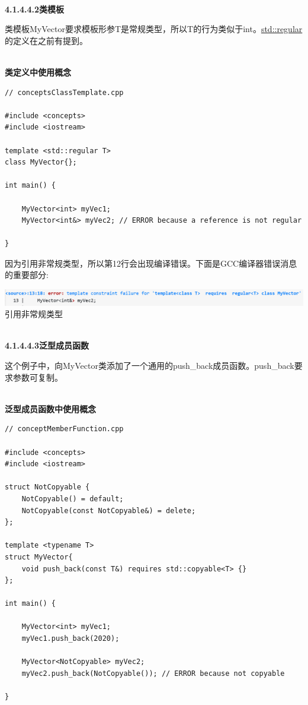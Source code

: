 \hspace*{\fill} \\ %
\noindent
\textbf{4.1.4.4.2\hspace{0.2cm}类模板}

类模板MyVector要求模板形参T是常规类型，所以T的行为类似于int。\href{https://en.cppreference.com/w/cpp/concepts/regular}{std::regular}的定义在之前有提到。

\hspace*{\fill} \\ %
\noindent
\textbf{类定义中使用概念}
\begin{lstlisting}[style=styleCXX]
// conceptsClassTemplate.cpp

#include <concepts>
#include <iostream>

template <std::regular T>
class MyVector{};

int main() {

	MyVector<int> myVec1;
	MyVector<int&> myVec2; // ERROR because a reference is not regular

}
\end{lstlisting}

因为引用非常规类型，所以第12行会出现编译错误。下面是GCC编译器错误消息的重要部分:

\begin{center}
\includegraphics[width=1.0\textwidth]{content/3/chapter4/images/1-3.png}\\
引用非常规类型
\end{center}

\hspace*{\fill} \\ %
\noindent
\textbf{4.1.4.4.3\hspace{0.2cm}泛型成员函数}

这个例子中，向MyVector类添加了一个通用的push\_back成员函数。push\_back要求参数可复制。

\hspace*{\fill} \\ %
\noindent
\textbf{泛型成员函数中使用概念}
\begin{lstlisting}[style=styleCXX]
// conceptMemberFunction.cpp

#include <concepts>
#include <iostream>

struct NotCopyable {
	NotCopyable() = default;
	NotCopyable(const NotCopyable&) = delete;
};

template <typename T>
struct MyVector{
	void push_back(const T&) requires std::copyable<T> {}
};

int main() {

	MyVector<int> myVec1;
	myVec1.push_back(2020);

	MyVector<NotCopyable> myVec2;
	myVec2.push_back(NotCopyable()); // ERROR because not copyable

}
\end{lstlisting}

